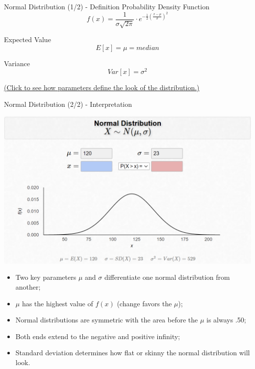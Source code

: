 \documentclass{beamer}
\begin{document}
\begin{frame}{Normal Distribution (1/2) - Definition}
Probability Density Function
$$ f(x) = \frac{1}{\sigma\sqrt{2\pi}} \cdot e^{-\frac{1}{2} \left(   \frac{x-\mu}{\sigma}\right)^2} $$

\vspace{0.3 cm}
Expected Value
$$ E[x] = \mu = median $$

Variance
$$ Var[x] = \sigma^2 $$

\begin{flushright}
\href{http://wentoday.com/wp/2020/10/06/normal-distribution-visualized-interactive/}{(Click to see how parameters define the look of the distribution.)}
\end{flushright}


\end{frame}


\begin{frame}{Normal Distribution (2/2) - Interpretation}

\begin{center}
\includegraphics[scale=0.4]{images/section4NormalDistIOWA.png}
\end{center}

\begin{scriptsize}

\begin{itemize}
\item Two key parameters $\mu$ and $\sigma$ differentiate one normal distribution from another; 
\item $\mu$ has the highest value of $f(x)$ (change favors the $\mu$);
\item Normal distributions are symmetric with the area before the $\mu$ is always .50;
\item Both ends extend to the negative and positive infinity;
\item Standard deviation determines how flat or skinny the normal distribution will look.
\end{itemize}

\end{scriptsize}


\end{frame}
\end{document}
